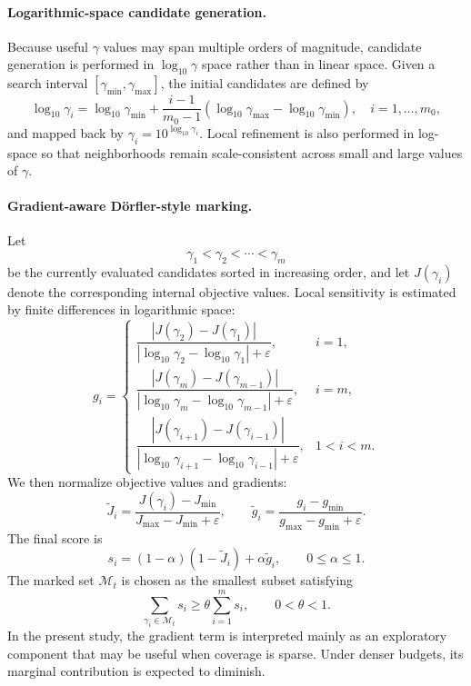 \documentclass[10pt,lineno]{wlpeerj}
\begin{document}
\paragraph{Logarithmic-space candidate generation.}
Because useful $\gamma$ values may span multiple orders of magnitude, candidate generation is performed in $\log_{10}\gamma$ space rather than in linear space. Given a search interval $[\gamma_{\min},\gamma_{\max}]$, the initial candidates are defined by
\[
\log_{10}\gamma_i = \log_{10}\gamma_{\min} + \frac{i-1}{m_0-1}\left(\log_{10}\gamma_{\max} - \log_{10}\gamma_{\min}\right),
\quad i=1,\dots,m_0,
\]
and mapped back by $\gamma_i = 10^{\log_{10}\gamma_i}$. Local refinement is also performed in log-space so that neighborhoods remain scale-consistent across small and large values of $\gamma$.

\paragraph{Gradient-aware D\"orfler-style marking.}
Let
\[
\gamma_1 < \gamma_2 < \cdots < \gamma_m
\]
be the currently evaluated candidates sorted in increasing order, and let $J(\gamma_i)$ denote the corresponding internal objective values. Local sensitivity is estimated by finite differences in logarithmic space:
\[
g_i =
\begin{cases}
\dfrac{|J(\gamma_{2})-J(\gamma_{1})|}{|\log_{10}\gamma_{2}-\log_{10}\gamma_{1}|+\varepsilon}, & i=1,\\[8pt]
\dfrac{|J(\gamma_{m})-J(\gamma_{m-1})|}{|\log_{10}\gamma_{m}-\log_{10}\gamma_{m-1}|+\varepsilon}, & i=m,\\[8pt]
\dfrac{|J(\gamma_{i+1})-J(\gamma_{i-1})|}{|\log_{10}\gamma_{i+1}-\log_{10}\gamma_{i-1}|+\varepsilon}, & 1<i<m.
\end{cases}
\]
We then normalize objective values and gradients:
\[
\tilde{J}_i = \frac{J(\gamma_i)-J_{\min}}{J_{\max}-J_{\min}+\varepsilon},
\qquad
\tilde{g}_i = \frac{g_i-g_{\min}}{g_{\max}-g_{\min}+\varepsilon}.
\]
The final score is
\[
s_i = (1-\alpha)(1-\tilde{J}_i) + \alpha \tilde{g}_i,
\qquad 0 \le \alpha \le 1.
\]
The marked set $\mathcal{M}_t$ is chosen as the smallest subset satisfying
\[
\sum_{\gamma_i \in \mathcal{M}_t} s_i \ge \theta \sum_{i=1}^{m} s_i,
\qquad 0 < \theta < 1.
\]
In the present study, the gradient term is interpreted mainly as an exploratory component that may be useful when coverage is sparse. Under denser budgets, its marginal contribution is expected to diminish.
\end{document}
